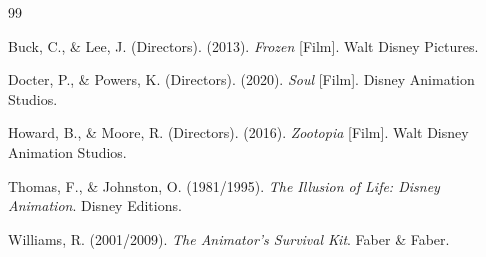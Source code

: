 \documentclass[11pt,a4paper]{article}
\begin{document}

\begin{thebibliography}{99}

Buck, C., \& Lee, J. (Directors). (2013). \textit{Frozen} [Film]. Walt Disney Pictures.

Docter, P., \& Powers, K. (Directors). (2020). \textit{Soul} [Film]. Disney Animation Studios.

Howard, B., \& Moore, R. (Directors). (2016). \textit{Zootopia} [Film]. Walt Disney Animation Studios.

Thomas, F., \& Johnston, O. (1981/1995). \textit{The Illusion of Life: Disney Animation}. Disney Editions.

Williams, R. (2001/2009). \textit{The Animator's Survival Kit}. Faber \& Faber.

\end{thebibliography}
\end{document}
